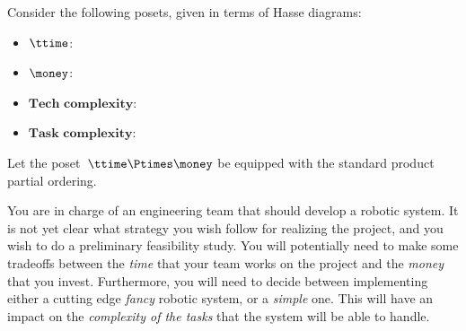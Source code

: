 \begin{gradedexercise}
    \label{ex:DPComposition}

    Consider the following posets, given in terms of Hasse diagrams:
    \begin{itemize}
        \item $\ttime$:
              \begin{center}
              \end{center}

        \item $\money$:
              \begin{center}
              \end{center}

        \item $\textbf{Tech complexity}$:
              \begin{center}
              \end{center}

        \item $\textbf{Task complexity}$:
              \begin{center}
              \end{center}
    \end{itemize}
    Let the poset~$\ttime \Ptimes \money$ be equipped with the standard product partial ordering.

    You are in charge of an engineering team that should develop a robotic system.
    It is not yet clear what strategy you wish follow for realizing the project, and you wish to do a preliminary feasibility study.
    You will potentially need to make some tradeoffs between the \emph{time} that your team works on the project and the \emph{money} that you invest.
    Furthermore, you will need to decide between implementing either a cutting edge \emph{fancy} robotic system, or a \emph{simple} one.
    This will have an impact on the \emph{complexity of the tasks} that the system will be able to handle.


\end{gradedexercise}
